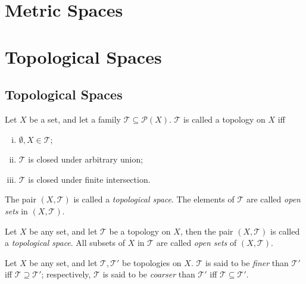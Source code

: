 \chapter{Metric Spaces}



\chapter{Topological Spaces}


\section{Topological Spaces}



\begin{definition}
	[topology]
	\label{def: topology}
	Let $X$ be a set, and let a family $\mathcal T \subseteq \mathcal P(X)$. $\mathcal T$ is called a topology on $X$ iff
	\begin{enumerate}[(i)]
		\item $\emptyset, X \in \mathcal T$;
		\item $\mathcal T$ is closed under arbitrary union;
		\item $\mathcal T$ is closed under finite intersection.
	\end{enumerate}
	The pair $(X, \mathcal T)$ is called a \textit{topological space}. The elements of $\mathcal T$ are called \textit{open sets} in $(X, \mathcal T)$.
\end{definition}


\begin{definition}
	\label{def: topological spaces}
	Let $X$ be any set, and let $\mathcal T$ be a topology on $X$, then the pair $(X, \mathcal T)$ is called a \textit{topological space}. All subsets of $X$ in $\mathcal T$ are called \textit{open sets} of $(X, \mathcal T)$.
\end{definition}


\begin{definition}
	\label{def: finer and coarser topology} Let $X$ be any set, and let $\mathcal T, \mathcal T'$ be topologies on $X$. $\mathcal T$ is said to be \textit{finer} than $\mathcal T'$ iff $\mathcal T \supseteq \mathcal T'$; respectively, $\mathcal T$ is said to be \textit{coarser} than $\mathcal T'$ iff $\mathcal T \subseteq \mathcal T'$.
\end{definition}


